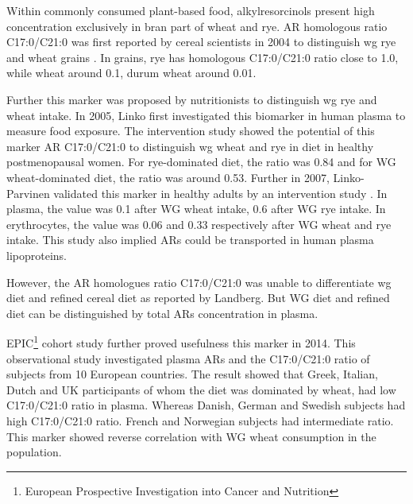 Within commonly consumed plant-based food, alkylresorcinols present high concentration exclusively in bran part of wheat and rye. AR homologous ratio C17:0/C21:0 was first reported by cereal scientists in 2004 to distinguish \acrshort{wg} rye and wheat grains \cite{Chen2004}. In grains, rye has homologous C17:0/C21:0 ratio close to 1.0, while wheat around 0.1, durum wheat around 0.01.

Further this marker was proposed by nutritionists to distinguish \acrshort{wg} rye and wheat intake. In 2005, Linko\cite{ISI:000376712600013} first investigated this biomarker in human plasma to measure food exposure. The intervention study showed the potential of this marker AR C17:0/C21:0 to distinguish \acrshort{wg} wheat and rye in diet in healthy postmenopausal women. 
For rye-dominated diet, the ratio was 0.84 and for WG wheat-dominated diet, the ratio was around 0.53. 
Further in 2007, Linko-Parvinen validated this marker in healthy adults by an intervention study \cite{10.1093/jn/137.5.1137}.
In plasma, the value was 0.1 after WG wheat intake, 0.6 after WG rye intake. In erythrocytes, the value was 0.06 and 0.33 respectively after WG wheat and rye intake. This study also implied ARs could be transported in human plasma lipoproteins.

However, the AR homologues ratio C17:0/C21:0 was unable to differentiate \acrshort{wg} diet and refined cereal diet as reported by Landberg\cite{ISI:000255012000007}. But WG diet and refined diet can be distinguished by total ARs concentration in plasma.

EPIC\footnote{European Prospective Investigation into Cancer and Nutrition} cohort study \cite{ISI:000334172400017} further proved usefulness this marker in 2014. This observational study investigated plasma ARs and the C17:0/C21:0 ratio of subjects from 10 European countries. 
The result showed that Greek, Italian, Dutch and UK participants of whom the diet was dominated by wheat, had low C17:0/C21:0 ratio in plasma. Whereas Danish, German and Swedish subjects had high C17:0/C21:0 ratio. French and Norwegian subjects had intermediate ratio. This marker showed reverse correlation with WG wheat consumption in the population.


